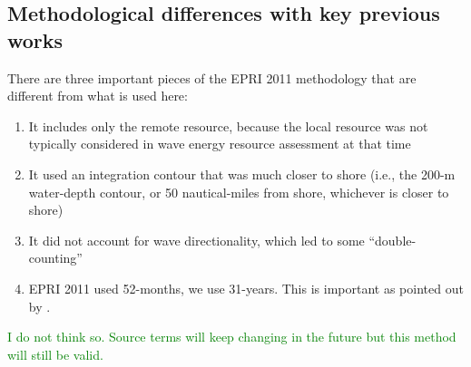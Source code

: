 \subsection{Methodological differences with key previous works}
\label{sec:method:changes}


There are three important pieces of the EPRI 2011 methodology that are different from what is used here:
\begin{enumerate}
\item It includes only the remote resource, because the local resource was not typically considered in wave energy resource assessment at that time
\item It used an integration contour that was much closer to shore (i.e., the 200-m water-depth contour, or 50 nautical-miles from shore, whichever is closer to shore)
\item It did not account for wave directionality, which led to some ``double-counting'' \cite{nationalresearchcouncilEvaluationDepartmentEnergy2013}
\item EPRI 2011 used 52-months, we use 31-years. This is important as pointed out by \cite{yangCharacteristicsVariabilityNearshore2020}.
\end{enumerate}
 \textcolor{green}{I do not think so. Source terms will keep changing in the future but this method will still be valid.}


